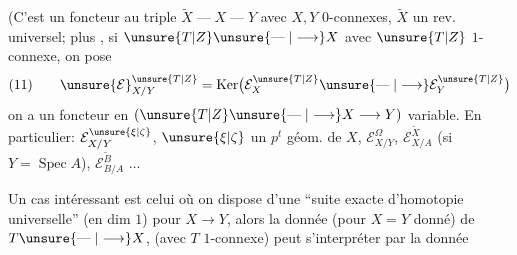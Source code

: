 
(C'est un foncteur  au triple $\widetilde X\mathrel{\text{---}}X\mathrel{\text{---}}Y$ avec $X,Y$ $0$-connexes, $\widetilde X$ un rev. universel; plus , si $\unsure{T|Z}\unsure{\mathrel{\text{---}}|\longrightarrow}X$ avec $\unsure{T|Z}$ $1$-connexe, on pose
\[
(11)\qquad \unsure{\mathcal E}_{X/Y}^{\unsure{T|Z}}=\operatorname{Ker}\bigl(\mathcal E_X^{\unsure{T|Z}}\unsure{\mathrel{\text{---}}|\longrightarrow}\mathcal E_Y^{\unsure{T|Z}}\bigr)
\]
on a un foncteur en  $(\unsure{T|Z}\unsure{\mathrel{\text{---}}|\longrightarrow}X\longrightarrow Y)$ variable. En particulier: $\mathcal E_{X/Y}^{\unsure{\xi|\zeta}}$, $\unsure{\xi|\zeta}$ un $p^t$ géom. de $X$, $\mathcal E_{X/Y}^{\Omega}$, $\mathcal E_{X/A}^{\widetilde X}$ (si $Y=\operatorname{Spec} A$), $\mathcal E_{B/A}^{\widetilde B}$ $\ldots$


Un cas intéressant est celui où on dispose d'une ``suite exacte d'homotopie universelle''  (en dim $1$) pour $X\longrightarrow Y$, alors la donnée (pour $X=Y$ donné) de $T\unsure{\mathrel{\text{---}}|\longrightarrow}X$, (avec $T$ $1$-connexe) peut s'interpréter par la donnée  

